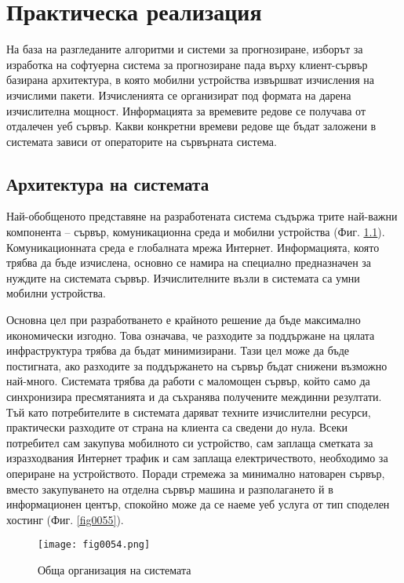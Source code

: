 ﻿\chapter{Практическа реализация}

На база на разгледаните алгоритми и системи за прогнозиране, изборът за изработка на софтуерна система за прогнозиране пада върху клиент-сървър базирана архитектура, в която мобилни устройства извършват изчисления на изчислими пакети. Изчисленията се организират под формата на дарена изчислителна мощност. Информацията за времевите редове се получава от отдалечен уеб сървър. Какви конкретни времеви редове ще бъдат заложени в системата зависи от операторите на сървърната система.

\section{Архитектура на системата}

Най-обобщеното представяне на разработената система съдържа трите най-важни компонента – сървър, комуникационна среда и мобилни устройства (Фиг. \ref{fig0054}). Комуникационната среда е глобалната мрежа Интернет. Информацията, която трябва да бъде изчислена, основно се намира на специално предназначен за нуждите на системата сървър. Изчислителните възли в системата са умни мобилни устройства. 

Основна цел при разработването е крайното решение да бъде максимално икономически изгодно. Това означава, че разходите за поддържане на цялата инфраструктура трябва да бъдат минимизирани. Тази цел може да бъде постигната, ако разходите за поддържането на сървър бъдат снижени възможно най-много. Системата трябва да работи с маломощен сървър, който само да синхронизира пресмятанията и да съхранява получените междинни резултати. Тъй като потребителите в системата даряват техните изчислителни ресурси, практически разходите от страна на клиента са сведени до нула. Всеки потребител сам закупува мобилното си устройство, сам заплаща сметката за изразходвания Интернет трафик и сам заплаща електричеството, необходимо за опериране на устройството. Поради стремежа за минимално натоварен сървър, вместо закупуването на отделна сървър машина и разполагането й в информационен център, спокойно може да се наеме уеб услуга от тип споделен хостинг (Фиг. \ref{fig0055}). 

\begin{figure}[H]
  \centering
  \texttt{[image: fig0054.png]}
  \caption{Обща организация на системата}
\label{fig0054}
\end{figure}

